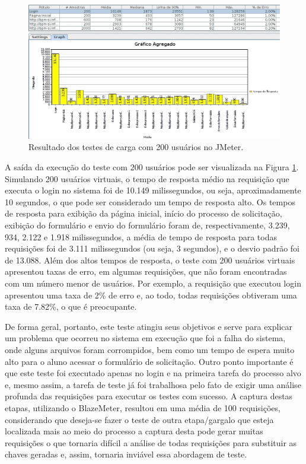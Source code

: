 \documentclass[12pt]{article}
\begin{document}
\begin{figure}[ht]
\centering
\includegraphics[width=.99\textwidth]{figuras/grafico200.jpg}
\caption{Resultado dos testes de carga com 200 usuários no JMeter.}
\label{fig:carga200}
\end{figure}

A saída da execução do teste com 200 usuários pode ser visualizada na Figura \ref{fig:carga200}. Simulando 200 usuários virtuais, o tempo de resposta médio na requisição que executa o login no sistema foi de 10.149 milissegundos, ou seja, aproximadamente 10 segundos, o que pode ser considerado um tempo de resposta alto. Os tempos de resposta para exibição da página inicial, início do processo de solicitação, exibição do formulário e envio do formulário foram de, respectivamente, 3.239, 934, 2.122 e 1.918 milissegundos, a média de tempo de resposta para todas requisições foi de 3.111 milissegundos (ou seja, 3 segundos), e o desvio padrão foi de 13.088. Além dos altos tempos de resposta, o teste com 200 usuários virtuais apresentou taxas de erro, em algumas requisições, que não foram encontradas com um número menor de usuários. Por exemplo, a requisição que executou login apresentou uma taxa de 2\% de erro e, ao todo, todas requisições obtiveram uma taxa de 7.82\%, o que é preocupante.

De forma geral, portanto, este teste atingiu seus objetivos e serve para explicar um problema que ocorreu no sistema em execução que foi a falha do sistema, onde alguns arquivos foram corrompidos, bem como um tempo de espera muito alto para o aluno acessar o formulário de solicitação. Outro ponto importante é que este teste foi executado apenas no login e na primeira tarefa do processo alvo e, mesmo assim, a tarefa de teste já foi trabalhosa pelo fato de exigir uma análise profunda das requisições para executar os testes com sucesso. A captura destas etapas, utilizando o BlazeMeter, resultou em uma média de 100 requisições, considerando que deseja-se fazer o teste de outra etapa/gargalo que esteja localizada mais ao meio do processo a captura desta pode gerar muitas requisições o que tornaria difícil a análise de todas requisições para substituir as chaves geradas e, assim, tornaria inviável essa abordagem de teste. 
\end{document}
